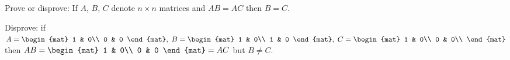 
\begin{Exercise}[
name={},
title={}, 
difficulty=0,
origin={\cite{YL}}]
Prove or disprove: If $A$, $B$, $C$ denote $n\times n$ matrices and $AB=AC$ then $B=C$.
\end{Exercise}

\begin{Answer}
Disprove: if $A=
\begin{mat} 
1 & 0\\
0 & 0
\end{mat},\;
B=\begin{mat}
1 & 0\\
1 & 0
\end{mat},\;
C=\begin{mat}
1 & 0\\
0 & 0\\
\end{mat}$ then $AB=\begin{mat}
1 & 0\\
0 & 0
\end{mat}
=AC$
but $B\neq C$.
\end{Answer}
